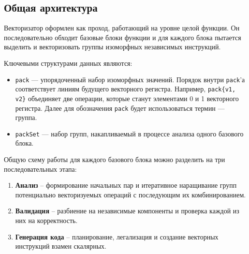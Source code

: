 \subsection{Общая архитектура}
\label{sec:architecture}

Векторизатор оформлен как проход, работающий на уровне целой функции. 
Он последовательно обходит базовые блоки функции и для каждого блока пытается выделить и
векторизовать группы изоморфных независимых инструкций.

Ключевыми структурами данных являются:
\begin{itemize}
    \item \texttt{pack} --- упорядоченный набор изоморфных значений. Порядок внутри \texttt{pack}'а соответствует линиям будущего векторного регистра.
    Например, \texttt{pack\{v1, v2\}} объединяет две операции, которые станут элементами 0 и 1 векторного регистра.
    Далее для обозначения \texttt{pack} будет использоваться термин --- группа.
    \item \texttt{packSet} --- набор групп, накапливаемый в процессе анализа одного базового блока.
\end{itemize}

Общую схему работы для каждого базового блока можно разделить на три последовательных этапа:
\begin{enumerate}
    \item \textbf{Анализ} -- формирование начальных пар и итеративное наращивание групп потенциально векторизуемых операций с последующим их комбинированием.
    \item \textbf{Валидация} -- разбиение на независимые компоненты и проверка каждой из них на корректность.
    \item \textbf{Генерация кода} -- планирование, легализация и создание векторных инструкций взамен скалярных.
\end{enumerate}

